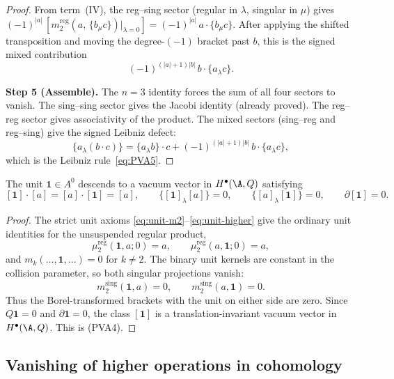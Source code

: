 \begin{proof}
From term~(IV), the reg--sing sector (regular in $\lambda$,
singular in $\mu$) gives
$(-1)^{|a|}\, [m_2^{\mathrm{reg}}(a,\, \{b_\mu c\})|_{\lambda=0}]
= (-1)^{|a|}\, a\cdot\{b_\mu c\}
$. After applying the shifted transposition and moving the
degree-\((-1)\) bracket past \(b\), this is the signed mixed
contribution
\[
(-1)^{(|a|+1)|b|}\,b\cdot\{a_\lambda c\}.
\]

\textbf{Step 5 (Assemble).}
The $n=3$ identity forces the sum of all four sectors to vanish.
The sing--sing sector gives the Jacobi identity (already proved).
The reg--reg sector gives associativity of the product.
The mixed sectors (sing--reg and reg--sing) give the signed
Leibniz defect:
\[
\{a_\lambda(b\cdot c)\}
=
\{a_\lambda b\}\cdot c
+
(-1)^{(|a|+1)|b|}\,b\cdot\{a_\lambda c\},
\]
which is the Leibniz rule~\eqref{eq:PVA5}.
\end{proof}

\begin{proposition}
The unit $\mathbf{1}\in A^0$ descends to a vacuum vector in
$H^\bullet(\A,Q)$ satisfying
\[
[\mathbf 1]\cdot[a]=[a]\cdot[\mathbf 1]=[a],\qquad
\{[\mathbf 1]_\lambda[a]\}=0,\qquad
\{[a]_\lambda[\mathbf 1]\}=0,\qquad
\partial[\mathbf 1]=0.
\]
\end{proposition}
\begin{proof}
The strict unit axioms \eqref{eq:unit-m2}--\eqref{eq:unit-higher} give
the ordinary unit identities for the unsuspended regular product,
\[
\mu_2^{\mathrm{reg}}(\mathbf 1,a;0)=a,\qquad
\mu_2^{\mathrm{reg}}(a,\mathbf 1;0)=a,
\]
and \(m_k(\ldots,\mathbf 1,\ldots)=0\) for \(k\ne2\).  The binary
unit kernels are constant in the collision parameter, so both
singular projections vanish:
\[
m_2^{\mathrm{sing}}(\mathbf 1,a)=0,\qquad
m_2^{\mathrm{sing}}(a,\mathbf 1)=0.
\]
Thus the Borel-transformed brackets with the unit on either side are
zero.  Since \(Q\mathbf 1=0\) and \(\partial\mathbf 1=0\), the class
\([\mathbf 1]\) is a translation-invariant vacuum vector in
\(H^\bullet(\A,Q)\).  This is (PVA4).
\end{proof}

\subsection{Vanishing of higher operations in cohomology}


